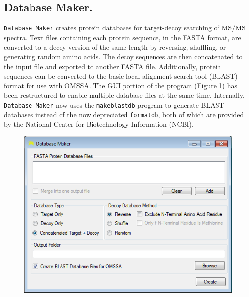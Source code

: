 \subsection*{Database Maker.}
\texttt{Database Maker} creates protein databases for target-decoy searching of MS/MS spectra. Text files containing each protein sequence, in the FASTA format, are converted to a decoy version of the same length by reversing, shuffling, or generating random amino acids.\cite{targetdecoy,targetdecoycomp,qscore} The decoy sequences are then concatenated to the input file and exported to another FASTA file. Additionally, protein sequences can be converted to the basic local alignment search tool (BLAST) format for use with OMSSA.\cite{blast} The GUI portion of the program (Figure \ref{fig:databasemaker}) has been restructured to enable multiple database files at the same time. Internally, \texttt{Database Maker} now uses the \texttt{makeblastdb} program to generate BLAST databases instead of the now depreciated \texttt{formatdb}, both of which are provided by the National Center for Biotechnology Information (NCBI).
\begin{figure}[p]
	\centering
	\includegraphics[width=\columnwidth]{csmsl/databasemaker.png}
	\label{fig:databasemaker}
\end{figure}

